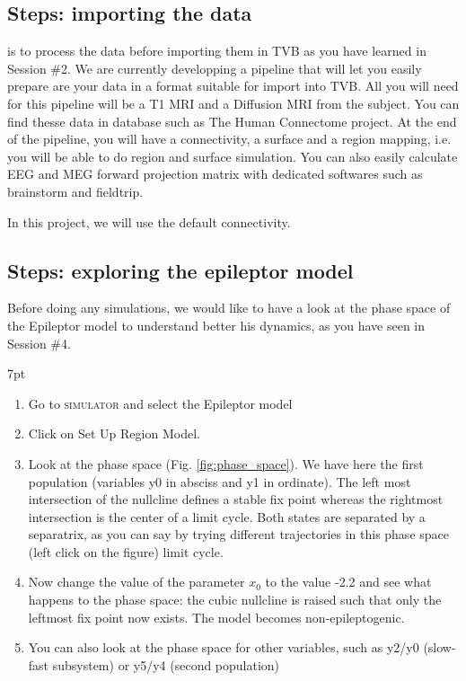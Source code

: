 \documentclass{tufte-handout}
\newenvironment{formal}{%
  \def\FrameCommand{%
    \hspace{1pt}%
    {\color{DarkBlue}\vrule width 2pt}%
    {\color{formalshade}\vrule width 4pt}%
    \colorbox{formalshade}%
  }%
  \MakeFramed{\advance\hsize-\width\FrameRestore}%
  \noindent\hspace{-4.55pt}%
  \begin{adjustwidth}{}{7pt}%
  \vspace{2pt}\vspace{2pt}%
}
{%
  \vspace{2pt}\end{adjustwidth}\endMakeFramed%
}
\begin{document}
\subsection{Steps: importing the data}\label{sec:import}

 is to process the data before importing them in TVB as you have learned in Session \#2.
We are currently developping a pipeline that will let you easily prepare are your data in a format suitable for import
into TVB. All you will need for this pipeline will be a T1 MRI and a Diffusion MRI from the subject. You can find thesse data
in database such as The Human Connectome project. At the end of the pipeline, you will have a connectivity, a surface and a region mapping, i.e. you will be able to do region and surface simulation. You can also 
easily calculate EEG and MEG forward projection matrix with dedicated softwares such as brainstorm and fieldtrip.

In this project, we will use the default connectivity.

\subsection{Steps: exploring the epileptor model}\label{sec:epileptor}

Before doing any simulations, we would like to have a look at the phase space of the Epileptor model
to understand better his dynamics, as you have seen in Session \#4.

\begin{formal}
  \begin{enumerate}[resume]
  \item Go to \textsc{simulator} and select the Epileptor model
  \item Click on Set Up Region Model.
  \item Look at the phase space (Fig. \ref{fig:phase_space}). We have here the first population (variables y0 in absciss and 
  y1 in ordinate).
  The left most intersection of the nullcline defines a stable fix point whereas the rightmost intersection 
  is the center of a limit cycle. Both states are separated by a separatrix, as you can say by trying different trajectories
  in this phase space (left click on the figure) limit cycle.
  \item Now change the value of the parameter $x_0$ to the value -2.2 and see what happens to the phase space: the cubic nullcline
  is raised such that only the leftmost fix point now exists. The model becomes non-epileptogenic.
  \item You can also look at the phase space for other variables, such as y2/y0 (slow-fast subsystem) or y5/y4 (second population)
  \end{enumerate}
\end{formal}
\end{document}
